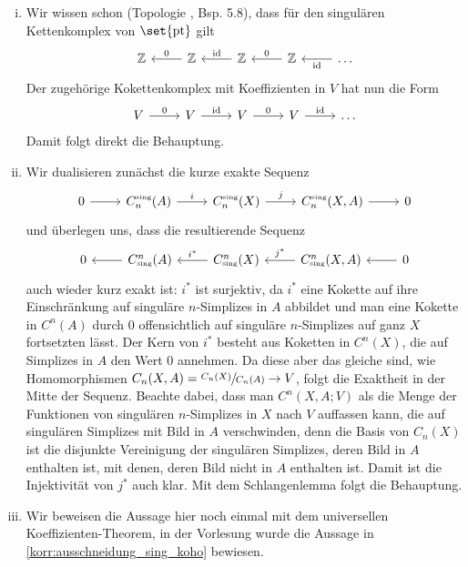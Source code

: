 \begin{beweis}[name={\cite[S. 199 ff]{Hatcher}}]
	\leavevmode
	\begin{enumerate}[(i)]
		\item Wir wissen schon (Topologie , Bsp. 5.8), dass für den singulären Kettenkomplex von $\set{\pt}$ gilt
		\[
			\begin{tikzcd}
				\mathbb{Z} & \mathbb{Z} \lar["0"'] & \mathbb{Z} \lar["\id"'] & \mathbb{Z} \lar["0"'] & \ldots \lar["\id"] 
			\end{tikzcd}
		\]
		Der zugehörige Kokettenkomplex mit Koeffizienten in $V$ hat nun die Form
		\[
			\begin{tikzcd}
				V \rar["0"] & V \rar["\id"] & V \rar["0"] & V \rar["\id"] & \ldots 
			\end{tikzcd}
		\]
		Damit folgt direkt die Behauptung.
		\item Wir dualisieren zunächst die kurze exakte Sequenz 
		\[
			\begin{tikzcd}
				0 \rar & C_n^\sing(A) \rar["i"] & C_n^\sing (X) \rar["j"] & C_n^\sing(X,A) \rar & 0
			\end{tikzcd}
		\]
		und überlegen uns, dass die resultierende Sequenz
		\[
			\begin{tikzcd}
				0 & C^n_\sing(A) \lar & C^n_\sing(X) \lar["i^*"'] & C^n_\sing(X,A) \lar["j^*"'] & 0 \lar
			\end{tikzcd}
		\]
		auch wieder kurz exakt ist:
		$i^*$ ist surjektiv, da $i^*$ eine Kokette auf ihre Einschränkung auf singuläre $n$-Simplizes in $A$ abbildet und man eine Kokette in $C^n(A)$ durch $0$ offensichtlich auf singuläre $n$-Simplizes auf ganz $X$ fortsetzten lässt.
		Der Kern von $i^*$ besteht aus Koketten in $C^n(X)$, die auf Simplizes in $A$ den Wert $0$ annehmen.
		Da diese aber das gleiche sind, wie Homomorphismen $C_n(X,A) = \sfrac{C_n(X)}{C_n(A)}\to V$, folgt die Exaktheit in der Mitte der Sequenz. Beachte dabei, dass man $C^n(X,A;V)$ als die Menge der Funktionen von singulären $n$-Simplizes in $X$ nach $V$ auffassen kann, die auf singulären Simplizes mit Bild in $A$ verschwinden, denn die Basis von $C_n(X)$ ist die disjunkte Vereinigung der singulären Simplizes, deren Bild in $A$ enthalten ist, mit denen, deren Bild nicht in $A$ enthalten ist.
		Damit ist die Injektivität von $j^*$ auch klar. 
		Mit dem Schlangenlemma folgt die Behauptung.
		\item Wir beweisen die Aussage hier noch einmal mit dem universellen Koeffizienten-Theorem, in der Vorlesung wurde die Aussage in \autoref{korr:ausschneidung_sing_koho} bewiesen.
		

\end{enumerate}
\end{beweis}
